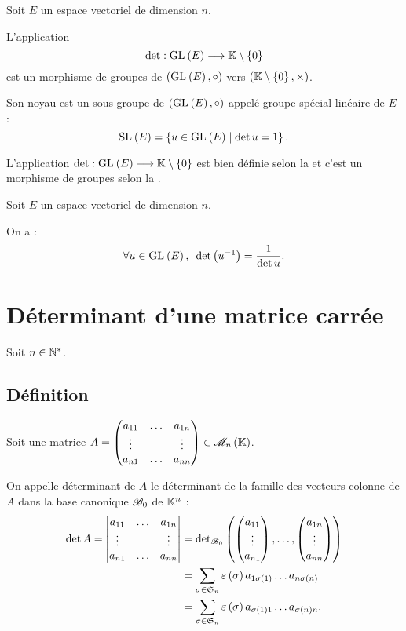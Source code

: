 \begin{defprop}
Soit \(E\) un espace vectoriel de dimension \(n\).

L'application \[\det:\GL{}[E]\to\K\excluant\accol{0}\] est un morphisme de groupes de \(\groupe{\GL{}[E]}[\rond]\) vers \(\groupe{\K\excluant\accol{0}}[\times]\).

Son noyau est un sous-groupe de \(\groupe{\GL{}[E]}[\rond]\) appelé groupe spécial linéaire de \(E\) : \[\SL{}[E]=\accol{u\in\GL{}[E]\tq\det u=1}.\]
\end{defprop}

\begin{dem}
L'application \(\det:\GL{}[E]\to\K\excluant\accol{0}\) est bien définie selon la  et c'est un morphisme de groupes selon la .
\end{dem}

\begin{cor}
Soit \(E\) un espace vectoriel de dimension \(n\).

On a : \[\quantifs{\forall u\in\GL{}[E]}\det\paren{u\inv}=\dfrac{1}{\det u}.\]
\end{cor}

\section{Déterminant d'une matrice carrée}

Soit \(n\in\mathbb{N}^*\).

\subsection{Définition}

\begin{defi}
Soit une matrice \(A=\begin{pmatrix}
a_{11} & \dots & a_{1n} \\
\vdots &  & \vdots \\
a_{n1} & \dots & a_{nn}
\end{pmatrix}\in\M{n}\).

On appelle déterminant de \(A\) le déterminant de la famille des vecteurs-colonne de \(A\) dans la base canonique \(\mathscr{B}_0\) de \(\mathbb{K}^n\) : \[\begin{aligned}
\det A=\begin{vmatrix}
a_{11} & \dots & a_{1n} \\
\vdots &  & \vdots \\
a_{n1} & \dots & a_{nn}
\end{vmatrix}&=\detb[\fami{B}_0]\paren{\tcoords{a_{11}}{\vdots}{a_{n1}},\dots,\tcoords{a_{1n}}{\vdots}{a_{nn}}} \\
&=\sum_{\sigma\in\S{n}}\sig{\sigma}a_{1\sigma\paren{1}}\dots a_{n\sigma\paren{n}} \\
&=\sum_{\sigma\in\S{n}}\sig{\sigma}a_{\sigma\paren{1}1}\dots a_{\sigma\paren{n}n}.
\end{aligned}\]
\end{defi}


